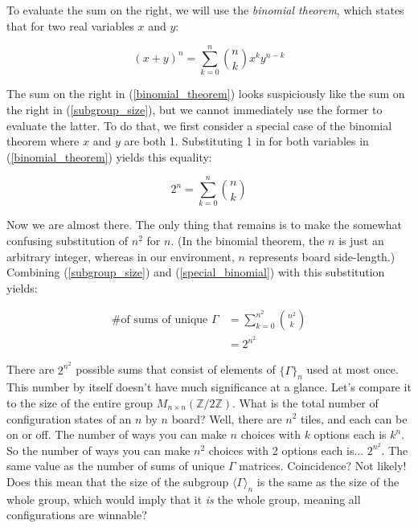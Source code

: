 \documentclass{article}[12pt]
\newcommand{\group}[1]{M_{#1 \times #1}(\mathbb{Z}/2\mathbb{Z})}
\newcommand{\subgroup}[1]{\langle\Gamma\rangle_{#1}}
\newcommand{\refx}[1]{(\ref{#1})}
\begin{document}
To evaluate the sum on the right, we will use the \emph{binomial theorem}, which states that for two real variables $x$ and $y$:

\begin{equation}
\label{binomial_theorem}
(x + y)^n = \sum_{k = 0}^n {n \choose k}x^ky^{n - k}
\end{equation}

The sum on the right in \refx{binomial_theorem} looks suspiciously like the sum on the right in \refx{subgroup_size}, but we cannot immediately use the former to evaluate the latter.  To do that, we first consider a special case of the binomial theorem where $x$ and $y$ are both 1.  Substituting 1 in for both variables in \refx{binomial_theorem} yields this equality:

\begin{equation}
\label{special_binomial}
2^n = \sum_{k = 0}^n {n \choose k}
\end{equation}

Now we are almost there.  The only thing that remains is to make the somewhat confusing substitution of $n^2$ for $n$.  (In the binomial theorem, the $n$ is just an arbitrary integer, whereas in our environment, $n$ represents board side-length.)  Combining \refx{subgroup_size} and \refx{special_binomial} with this substitution yields:

\begin{equation}
\begin{aligned}
\text{\# of sums of unique $\Gamma$} &= \sum_{k = 0}^{n^2} {n^2 \choose k}\\
&= 2^{n^2}
\end{aligned}
\end{equation}

There are $2^{n^2}$ possible sums that consist of elements of $\{\Gamma\}_n$ used at most once.  This number by itself doesn't have much significance at a glance.  Let's compare it to the size of the entire group $\group{n}$.  What is the total number of configuration states of an $n$ by $n$ board?  Well, there are $n^2$ tiles, and each can be on or off.  The number of ways you can make $n$ choices with $k$ options each is $k^n$.  So the number of ways you can make $n^2$ choices with 2 options each is... $2^{n^2}$.  The same value as the number of sums of unique $\Gamma$ matrices.  Coincidence?  Not likely!  Does this mean that the size of the subgroup $\subgroup{n}$ is the same as the size of the whole group, which would imply that it \emph{is} the whole group, meaning all configurations are winnable?
\end{document}
